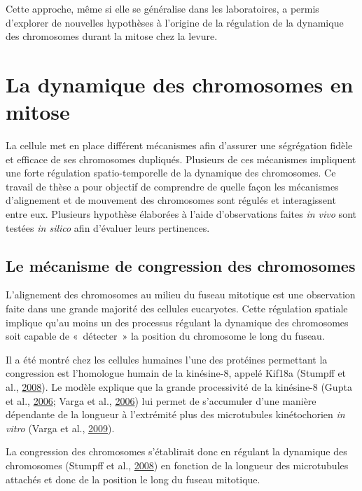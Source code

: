 \documentclass[12pt,a4paper,twoside,openright]{book}
\begin{document}
Cette approche, même si elle se généralise dans les laboratoires, a
permis d'explorer de nouvelles hypothèses à l'origine de la régulation
de la dynamique des chromosomes durant la mitose chez la levure.

\section{La dynamique des chromosomes en
mitose}\label{la-dynamique-des-chromosomes-en-mitose}

La cellule met en place différent mécanismes afin d'assurer une
ségrégation fidèle et efficace de ses chromosomes dupliqués. Plusieurs
de ces mécanismes impliquent une forte régulation spatio-temporelle de
la dynamique des chromosomes. Ce travail de thèse a pour objectif de
comprendre de quelle façon les mécanismes d'alignement et de mouvement
des chromosomes sont régulés et interagissent entre eux. Plusieurs
hypothèse élaborées à l'aide d'observations faites \emph{in vivo} sont
testées \emph{in silico} afin d'évaluer leurs pertinences.

\subsection{Le mécanisme de congression des
chromosomes}\label{le-muxe9canisme-de-congression-des-chromosomes}

L'alignement des chromosomes au milieu du fuseau mitotique est une
observation faite dans une grande majorité des cellules eucaryotes.
Cette régulation spatiale implique qu'au moins un des processus régulant
la dynamique des chromosomes soit capable de «~détecter~» la position du
chromosome le long du fuseau.

Il a été montré chez les cellules humaines l'une des protéines
permettant la congression est l'homologue humain de la kinésine-8,
appelé Kif18a (Stumpff et al.,
\protect\hyperlink{ref-Stumpff2008}{2008}). Le modèle explique que la
grande processivité de la kinésine-8 (Gupta et al.,
\protect\hyperlink{ref-Gupta2006}{2006}; Varga et al.,
\protect\hyperlink{ref-Varga2006}{2006}) lui permet de s'accumuler d'une
manière dépendante de la longueur à l'extrémité plus des microtubules
kinétochorien \emph{in vitro} (Varga et al.,
\protect\hyperlink{ref-Varga2009}{2009}).

La congression des chromosomes s'établirait donc en régulant la
dynamique des chromosomes (Stumpff et al.,
\protect\hyperlink{ref-Stumpff2008}{2008}) en fonction de la longueur
des microtubules attachés et donc de la position le long du fuseau
mitotique.
\end{document}
